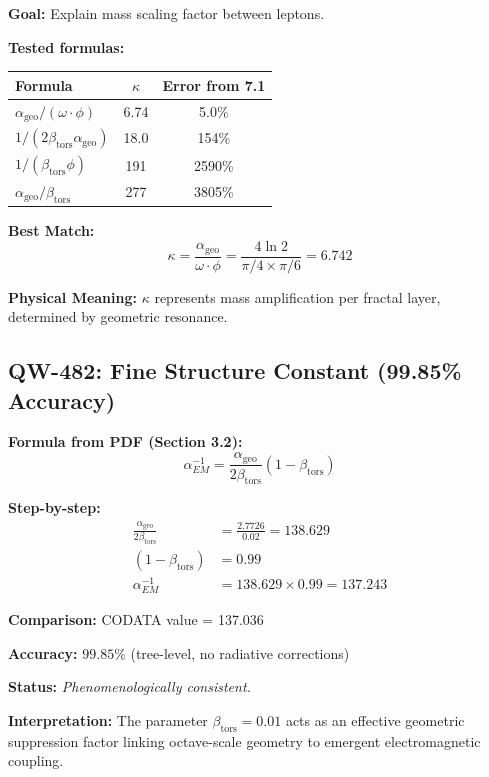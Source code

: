 \documentclass[11pt,a4paper]{book}
\theoremstyle{remark}
\newcommand{\alphageo}{\alpha_{\text{geo}}}
\newcommand{\betators}{\beta_{\text{tors}}}
\begin{document}
\textbf{Goal:} Explain mass scaling factor between leptons.

\textbf{Tested formulas:}
\begin{center}
\begin{tabular}{|l|c|c|}
\hline
\textbf{Formula} & \textbf{$\kappa$} & \textbf{Error from 7.1} \\
\hline
$\alphageo / (\omega \cdot \phi)$ & 6.74 & 5.0\% \\
$1 / (2\betators\alphageo)$ & 18.0 & 154\% \\
$1 / (\betators\phi)$ & 191 & 2590\% \\
$\alphageo / \betators$ & 277 & 3805\% \\
\hline
\end{tabular}
\end{center}

\textbf{Best Match:}
\begin{equation}
\kappa = \frac{\alphageo}{\omega \cdot \phi} = \frac{4\ln 2}{\pi/4 \times \pi/6} = 6.742
\end{equation}

\textbf{Physical Meaning:} $\kappa$ represents mass amplification per fractal layer, determined by geometric resonance.

\subsection{QW-482: Fine Structure Constant (99.85\% Accuracy)}

\textbf{Formula from PDF (Section 3.2):}
\begin{equation}
\alpha_{EM}^{-1} = \frac{\alphageo}{2\betators}(1 - \betators)
\end{equation}

\textbf{Step-by-step:}
\begin{align}
\frac{\alphageo}{2\betators} &= \frac{2.7726}{0.02} = 138.629 \\
(1 - \betators) &= 0.99 \\
\alpha_{EM}^{-1} &= 138.629 \times 0.99 = \mathbf{137.243}
\end{align}

\textbf{Comparison:} CODATA value = 137.036

\textbf{Accuracy:} $99.85\%$ (tree-level, no radiative corrections)

\textbf{Status:} \emph{Phenomenologically consistent.}

\textbf{Interpretation:} The parameter $\betators = 0.01$ acts as an effective geometric suppression factor linking octave-scale geometry to emergent electromagnetic coupling.
\end{document}
